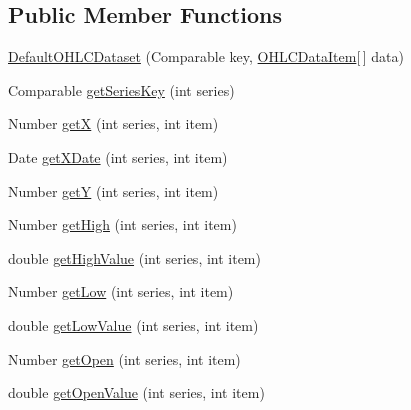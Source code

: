 \subsection*{Public Member Functions}
\begin{DoxyCompactItemize}
\item 
\mbox{\hyperlink{classorg_1_1jfree_1_1data_1_1xy_1_1_default_o_h_l_c_dataset_ab8737598bf279120367884c275d828a9}{Default\+O\+H\+L\+C\+Dataset}} (Comparable key, \mbox{\hyperlink{classorg_1_1jfree_1_1data_1_1xy_1_1_o_h_l_c_data_item}{O\+H\+L\+C\+Data\+Item}}\mbox{[}$\,$\mbox{]} data)
\item 
Comparable \mbox{\hyperlink{classorg_1_1jfree_1_1data_1_1xy_1_1_default_o_h_l_c_dataset_a375f8aeeebf0b8b7fb7f4c7f5c60fb55}{get\+Series\+Key}} (int series)
\item 
Number \mbox{\hyperlink{classorg_1_1jfree_1_1data_1_1xy_1_1_default_o_h_l_c_dataset_aeb1a869407d3258cca101ad2408ad17c}{getX}} (int series, int item)
\item 
Date \mbox{\hyperlink{classorg_1_1jfree_1_1data_1_1xy_1_1_default_o_h_l_c_dataset_adcf9c5fe5882716df1ab7b8f1c77e5ff}{get\+X\+Date}} (int series, int item)
\item 
Number \mbox{\hyperlink{classorg_1_1jfree_1_1data_1_1xy_1_1_default_o_h_l_c_dataset_aa36cc16a07371b3e5027f2a9343bb24f}{getY}} (int series, int item)
\item 
Number \mbox{\hyperlink{classorg_1_1jfree_1_1data_1_1xy_1_1_default_o_h_l_c_dataset_a23bff0b7d14e36f42fe82fd177f050d6}{get\+High}} (int series, int item)
\item 
double \mbox{\hyperlink{classorg_1_1jfree_1_1data_1_1xy_1_1_default_o_h_l_c_dataset_a7c992f9b0fac581e574332c70329fae7}{get\+High\+Value}} (int series, int item)
\item 
Number \mbox{\hyperlink{classorg_1_1jfree_1_1data_1_1xy_1_1_default_o_h_l_c_dataset_a6613a90e1ad1a6ecfdee32baa3097a14}{get\+Low}} (int series, int item)
\item 
double \mbox{\hyperlink{classorg_1_1jfree_1_1data_1_1xy_1_1_default_o_h_l_c_dataset_a507dcc283d6624b8da7d12c4352dcd0d}{get\+Low\+Value}} (int series, int item)
\item 
Number \mbox{\hyperlink{classorg_1_1jfree_1_1data_1_1xy_1_1_default_o_h_l_c_dataset_a851641b43354b55dcd343a57b5f1b4a9}{get\+Open}} (int series, int item)
\item 
double \mbox{\hyperlink{classorg_1_1jfree_1_1data_1_1xy_1_1_default_o_h_l_c_dataset_aa27c323e713453b49bad22eecd6597e2}{get\+Open\+Value}} (int series, int item)

\end{DoxyCompactItemize}
